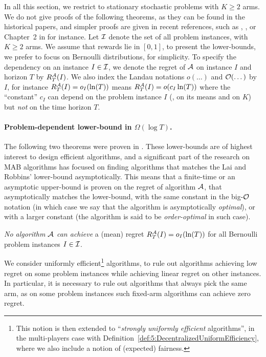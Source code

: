 In all this section, we restrict to stationary stochastic problems with $K\geq2$ arms.
We do not give proofs of the following theorems, as they can be found in the historical papers, and simpler proofs are given in recent references, such as \cite{Bubeck12}, \cite{LattimoreBanditAlgorithmsBook}, or Chapter~2 in \cite{Slivkins2019} for instance.
%
Let $\mathcal{I}$ denote the set of all problem instances, with $K \geq 2$ arms.
We assume that rewards lie in $[0,1]$,
to present the lower-bounds, we prefer to focus on Bernoulli distributions, for simplicity.
%
To specify the dependency on an instance $I\in\mathcal{I}$, we denote the regret of $\mathcal{A}$ on instance $I$ and horizon $T$ by $R_T^{\mathcal{A}}(I)$.
We also index the Landau notations $o(\dots)$ and $\mathop{}\mathopen{}\mathcal{O}\mathopen{}\left(\dots\right)$ by $I$,
for instance $R_T^{\mathcal{A}}(I) = o_I(\ln(T))$ means $R_T^{\mathcal{A}}(I) = \mathop{}\mathopen{}o\mathopen{}\left(c_I \ln(T)\right)$
where the ``constant'' $c_I$ can depend on the problem instance $I$ (\eg, on its means and on $K$) but \emph{not} on the time horizon $T$.


\paragraph{Problem-dependent lower-bound in $\Omega(\log T)$.}
%
The following two theorems were proven in \cite{LaiRobbins85}.
These lower-bounds are of highest interest to design efficient algorithms,
and a significant part of the research on MAB algorithms has focused on finding algorithms that matches the Lai and Robbins' lower-bound asymptotically.
This means that a finite-time or an asymptotic upper-bound is proven on the regret of algorithm $\mathcal{A}$, that asymptotically matches the lower-bound, with the same constant in the big-$\mathcal{O}$ notation (in which case we say that the algorithm is asymptotically \emph{optimal}), or with a larger constant (the algorithm is said to be \emph{order-optimal} in such case).


\begin{theorem}\label{thm:2:firstLogTLowerBound}
\begin{leftbar}[theorembar]  %
    \emph{No algorithm $\mathcal{A}$ can achieve} a (mean) regret $R_T^{\mathcal{A}}(I) = o_I(\ln(T))$ for all Bernoulli problem instances $I \in \mathcal{I}$.
    \hfill{} \cite[Theorem~2.12]{Slivkins2019}
\end{leftbar}  %
\end{theorem}

We consider uniformly efficient\footnote{This notion is then extended to ``\emph{strongly uniformly efficient} algorithms'', in the multi-players case with Definition~\ref{def:5:DecentralizedUniformEfficiency}, where we also include a notion of (expected) fairness.} algorithms, to rule out algorithms achieving low regret on some problem instances while achieving linear regret on other instances.
In particular, it is necessary to rule out algorithms that always pick the same arm, as on some problem instances such fixed-arm algorithms can achieve zero regret.

